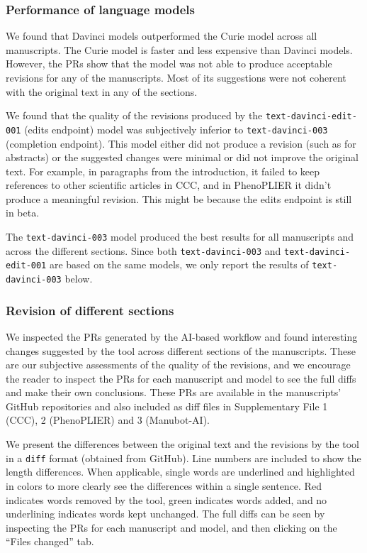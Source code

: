 \documentclass[
]{article}
\begin{document}
\hypertarget{performance-of-language-models}{%
\subsubsection{Performance of language models}\label{performance-of-language-models}}

We found that Davinci models outperformed the Curie model across all manuscripts.
The Curie model is faster and less expensive than Davinci models.
However, the PRs show that the model was not able to produce acceptable revisions for any of the manuscripts.
Most of its suggestions were not coherent with the original text in any of the sections.

We found that the quality of the revisions produced by the \texttt{text-davinci-edit-001} (edits endpoint) model was subjectively inferior to \texttt{text-davinci-003} (completion endpoint).
This model either did not produce a revision (such as for abstracts) or the suggested changes were minimal or did not improve the original text.
For example, in paragraphs from the introduction, it failed to keep references to other scientific articles in CCC, and in PhenoPLIER it didn't produce a meaningful revision.
This might be because the edits endpoint is still in beta.

The \texttt{text-davinci-003} model produced the best results for all manuscripts and across the different sections.
Since both \texttt{text-davinci-003} and \texttt{text-davinci-edit-001} are based on the same models, we only report the results of \texttt{text-davinci-003} below.

\hypertarget{revision-of-different-sections}{%
\subsubsection{Revision of different sections}\label{revision-of-different-sections}}

We inspected the PRs generated by the AI-based workflow and found interesting changes suggested by the tool across different sections of the manuscripts.
These are our subjective assessments of the quality of the revisions, and we encourage the reader to inspect the PRs for each manuscript and model to see the full diffs and make their own conclusions.
These PRs are available in the manuscripts' GitHub repositories and also included as diff files in Supplementary File 1 (CCC), 2 (PhenoPLIER) and 3 (Manubot-AI).

We present the differences between the original text and the revisions by the tool in a \texttt{diff} format (obtained from GitHub).
Line numbers are included to show the length differences.
When applicable, single words are underlined and highlighted in colors to more clearly see the differences within a single sentence.
Red indicates words removed by the tool, green indicates words added, and no underlining indicates words kept unchanged.
The full diffs can be seen by inspecting the PRs for each manuscript and model, and then clicking on the ``Files changed'' tab.
\end{document}
